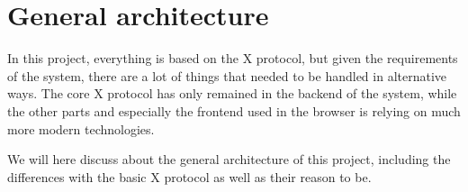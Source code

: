 \chapter{General architecture}
\label{chap:general-architecture}
%
In this project, everything is based on the X protocol, but given the 
requirements of the system, there are a lot of things that needed to be 
handled in alternative ways. The core X protocol has only remained 
in the backend of the system, while the other parts and especially the 
frontend used in the browser is relying on much more modern technologies.

We will here discuss about the general architecture of this project, 
including the differences with the basic X protocol as well as their 
reason to be.
%

%

%

